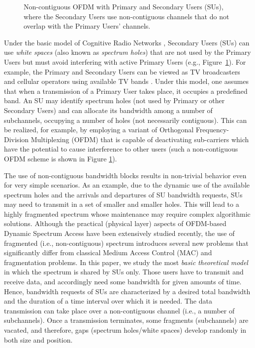 \documentclass{amsart}
\begin{document}
\begin{figure}[t]
\center
{}
\caption{Non-contiguous OFDM with Primary and Secondary Users (SUs), where the Secondary Users use non-contiguous channels that do not overlap with the Primary Users' channels.}
\label{fig:OFDMA}
\end{figure}

Under the basic model of  Cognitive Radio Networks \cite{AkyildizLVM2006}, Secondary Users (SUs)
can  use \emph{white  spaces} (also known as \emph{spectrum holes}) that are  not  used by  the Primary  Users  but must  avoid
interfering  with active Primary  Users (e.g.,  Figure~\ref{fig:OFDMA}). For  example, the
Primary and Secondary Users can be  viewed as TV broadcasters and cellular operators using
available  TV bands \cite{IEEE80222}.
Under this  model, one assumes  that when a  transmission of a  Primary User takes  place, it
occupies a  predefined band.  An SU may identify  spectrum holes (not  used by
Primary or other  Secondary Users) and can  allocate its bandwidth  among a  number of subchannels,
occupying a number of holes (not necessarily contiguous).  This can  be realized, for example, by employing a variant of
Orthogonal  Frequency-Division  Multiplexing  (OFDM)   that  is  capable  of  deactivating
sub-carriers   which  have   the  potential   to  cause   interference  to   other  users
\cite{GhasemiS2008,MahmoudYA2009,Horne2005,JondralW2004,QinetiQ2006,Rajbanshi2007} (such a non-contiguous OFDM scheme is shown in Figure \ref{fig:OFDMA}).

The use of non-contiguous  bandwidth blocks results in non-trivial behavior  even for very simple
scenarios. As an example, due to the dynamic use of the available spectrum holes
and the arrivals and departures of SU bandwidth requests, SUs may need to transmit
in a set of smaller and smaller holes. This will lead to a highly fragmented spectrum whose maintenance may require complex algorithmic solutions.
Although the practical (physical layer) aspects of OFDM-based Dynamic Spectrum
Access have been extensively studied  recently, the use of
fragmented (i.e., non-contiguous)  spectrum  introduces   several  new   problems
\cite{JiaZS2008,YuanBahl2007,QinetiQ2006} that significantly  differ from classical Medium
Access Control (MAC) and fragmentation problems. 
In this  paper, we study  the most \emph{basic theoretical model} in which the  spectrum is shared  by SUs only.
Those users have to transmit and receive data, and accordingly need some bandwidth for given amounts of time. Hence, bandwidth requests of SUs are characterized by a  desired total bandwidth
and the  duration of a  time interval over  which it is needed. The data transmission can take place
over a non-contiguous channel (i.e.,  a number of subchannels).  Once a transmission   terminates,  some  fragments   (subchannels)  are  vacated,  and  therefore,  gaps
(spectrum  holes/white spaces)  develop randomly in  both size and  position.
\end{document}
